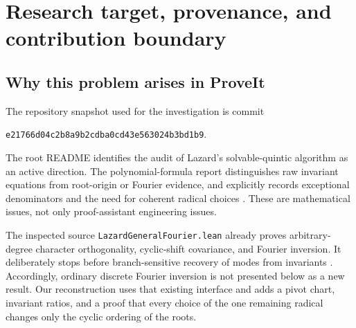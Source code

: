 \documentclass[11pt,a4paper]{article}
\theoremstyle{definition}
\theoremstyle{remark}
\newcommand{\code}[1]{{\small\nolinkurl{#1}}}
\newcommand{\snapshot}{\nolinkurl{e21766d04c2b8a9b2cdba0cd43e563024b3bd1b9}}
\begin{document}
\clearpage
\begingroup\small
\tableofcontents
\endgroup
\clearpage

\section{Research target, provenance, and contribution boundary}
\label{rss:sec:boundary}

\subsection{Why this problem arises in ProveIt}

The repository snapshot used for the investigation is commit
\begin{center}\snapshot.\end{center}
The root README identifies the audit of Lazard's solvable-quintic algorithm
as an active direction. The polynomial-formula report distinguishes raw
invariant equations from root-origin or Fourier evidence, and explicitly
records exceptional denominators and the need for coherent radical choices
\cite{repoReadme,repoReport,repoCrosswalk}. These are mathematical issues, not
only proof-assistant engineering issues.

The inspected source \code{LazardGeneralFourier.lean} already proves
arbitrary-degree character orthogonality, cyclic-shift covariance, and
Fourier inversion. It deliberately stops before branch-sensitive recovery
of modes from invariants \cite{repoFourier}. Accordingly, ordinary discrete
Fourier inversion is not presented below as a new result. Our reconstruction
uses that existing interface and adds a pivot chart, invariant ratios,
and a proof that every choice of the one remaining radical changes only the
cyclic ordering of the roots.
\end{document}
